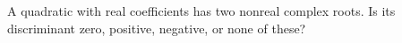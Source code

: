 A quadratic with real coefficients has two nonreal complex roots. Is its discriminant zero, positive, negative, or none of these?
